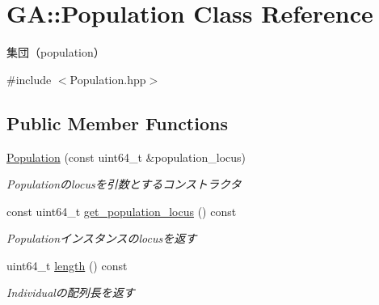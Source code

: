 \hypertarget{class_g_a_1_1_population}{}\section{GA\+::Population Class Reference}
\label{class_g_a_1_1_population}


集団（population）  




{\ttfamily \#include $<$Population.\+hpp$>$}

\subsection*{Public Member Functions}
\begin{DoxyCompactItemize}
\item 
\mbox{\label{class_g_a_1_1_population_a6ebc73e0c16b36463ea2834fb5dc53e7}} 
\mbox{\hyperlink{class_g_a_1_1_population_a6ebc73e0c16b36463ea2834fb5dc53e7}{Population}} (const uint64\+\_\+t \&population\+\_\+locus)
\begin{DoxyCompactList}\small\item\em Populationのlocusを引数とするコンストラクタ \end{DoxyCompactList}\item 
\mbox{\label{class_g_a_1_1_population_a8dcdd839cb17b00327bed382207dcc87}} 
const uint64\+\_\+t \mbox{\hyperlink{class_g_a_1_1_population_a8dcdd839cb17b00327bed382207dcc87}{get\+\_\+population\+\_\+locus}} () const
\begin{DoxyCompactList}\small\item\em Populationインスタンスのlocusを返す \end{DoxyCompactList}\item 
\mbox{\label{class_g_a_1_1_population_a33cbabc8b461b7d0486dba2c064ee005}} 
uint64\+\_\+t \mbox{\hyperlink{class_g_a_1_1_population_a33cbabc8b461b7d0486dba2c064ee005}{length}} () const
\begin{DoxyCompactList}\small\item\em Individualの配列長を返す \end{DoxyCompactList}\item 
\mbox{\label{class_g_a_1_1_population_af054c634ff6cff4b3187649f9c4e7357}} 

\end{DoxyCompactItemize}
